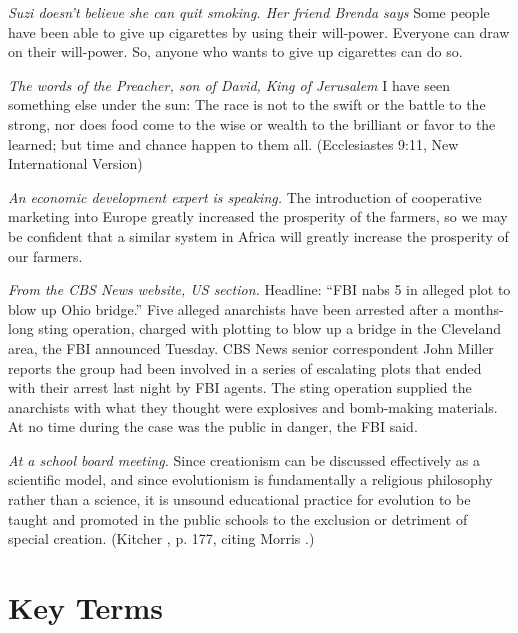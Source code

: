 %
\begin{exercises}
\item \textit{Suzi doesn't believe she can quit smoking. Her friend Brenda says} Some people have been able to give up cigarettes by using their will-power. Everyone can draw on their will-power. So, anyone who wants to give up cigarettes can do so.

\item \textit{The words of the Preacher, son of David, King of Jerusalem} I have seen something else under the sun: The race is not to the swift or the battle to the strong, nor does food come to the wise or wealth to the brilliant or favor to the learned; but time and chance happen to them all. (Ecclesiastes 9:11, New International Version)

\item \textit{An economic development expert is speaking.} The introduction of cooperative marketing into Europe greatly increased the prosperity of the farmers, so we may be confident that a similar system in Africa will greatly increase the prosperity of our farmers.

\item \textit{From the CBS News website, US section.} Headline: ``FBI nabs 5 in alleged plot to blow up Ohio bridge.'' Five alleged anarchists have been arrested after a months-long sting operation, charged with plotting to blow up a bridge in the Cleveland area, the FBI announced Tuesday. CBS News senior correspondent John Miller reports the group had been involved in a series of escalating plots that ended with their arrest last night by FBI agents. The sting operation supplied the anarchists with what they thought were explosives and bomb-making materials. At no time during the case was the public in danger, the FBI said. \citep{CBSNews2012}


\item \textit{At a school board meeting.} Since creationism can be discussed effectively as a scientific model, and since evolutionism is fundamentally a religious philosophy rather than a science, it is unsound educational practice for evolution to be taught and promoted in the public schools to the exclusion or detriment of special creation. (Kitcher \cite*{Kitcher1982}, p. 177, citing Morris \cite*{Morris1975}.)

\end{exercises}

\pagebreak
\section*{Key Terms}
\begin{multicols}{2}
\begin{sortedlist}
\end{sortedlist}
\end{multicols}